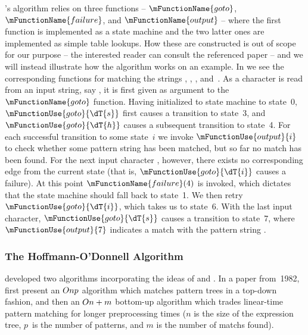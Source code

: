 {\citeauthor{Aho1975}'s algorithm relies on three
functions -- $\mFunctionName{goto}$, $\mFunctionName{failure}$, and
$\mFunctionName{output}$ -- where the first function is implemented as a
\gls{state machine} and the two latter ones are implemented as simple table
lookups.
%
How these are constructed is out of scope for our purpose -- the
interested reader can consult the referenced paper -- and we will instead
illustrate how the algorithm works on an example.
%
In
 we see the corresponding functions for
matching the strings , , ,
and~.
%
As a character is read from an input string, say
, it is first given as argument to the $\mFunctionName{goto}$
function.
%
Having initialized to \gls{state machine} to state~0,
$\mFunctionUse{goto}{\dT{s}}$ first causes a transition to state~3, and
$\mFunctionUse{goto}{\dT{h}}$ causes a subsequent transition to state~4.
%
For
each successful transition to some state~$i$ we invoke
$\mFunctionUse{output}{i}$ to check whether some \gls{pattern} string has been
matched, but so far no \gls{match} has been found.
%
For the next input character
, however, there exists no corresponding \gls{edge} from the current state
(that is, $\mFunctionUse{goto}{\dT{i}}$ causes a failure).
%
At this point
$\mFunctionName{failure}(4)$ is invoked, which dictates that the \gls{state
  machine} should fall back to state~1.
%
We then retry
$\mFunctionUse{goto}{\dT{i}}$, which takes us to state~6.
%
With the last input
character, $\mFunctionUse{goto}{\dT{s}}$ causes a transition to state~7, where
$\mFunctionUse{output}{7}$ indicates a \gls{match} with the \gls{pattern} string
.


\subsubsection{The Hoffmann-O'Donnell Algorithm}

\textcite{Hoffmann1982} developed two algorithms incorporating the ideas of
\citeauthor{Aho1975} and \citeauthor{Knuth1977}.
%
In a paper from~1982,
\citeauthor{Hoffmann1982} first present an \mbox{$O{np}$} algorithm which
matches \glspl{pattern tree} in a top-down fashion, and then an
\mbox{$O{n+m}$} bottom-up algorithm which trades linear-time \gls{pattern
  matching} for longer preprocessing times ($n$ is the size of the \gls{expression tree}, $p$~is the number of \glspl{pattern}, and $m$ is the number of
\glspl{match} found).

}
